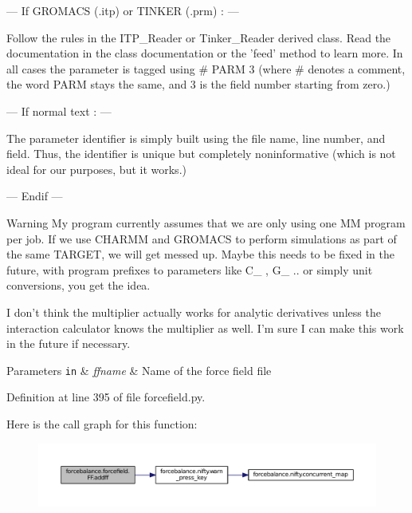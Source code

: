 --- If G\-R\-O\-M\-A\-C\-S (.itp) or T\-I\-N\-K\-E\-R (.prm) \-: ---

Follow the rules in the I\-T\-P\-\_\-\-Reader or Tinker\-\_\-\-Reader derived class. Read the documentation in the class documentation or the 'feed' method to learn more. In all cases the parameter is tagged using {\ttfamily  \# P\-A\-R\-M 3 } (where \# denotes a comment, the word P\-A\-R\-M stays the same, and 3 is the field number starting from zero.)

--- If normal text \-: ---

The parameter identifier is simply built using the file name, line number, and field. Thus, the identifier is unique but completely noninformative (which is not ideal for our purposes, but it works.)

--- Endif ---

\begin{DoxyWarning}{Warning}
My program currently assumes that we are only using one M\-M program per job. If we use C\-H\-A\-R\-M\-M and G\-R\-O\-M\-A\-C\-S to perform simulations as part of the same T\-A\-R\-G\-E\-T, we will get messed up. Maybe this needs to be fixed in the future, with program prefixes to parameters like C\-\_\- , G\-\_\- .. or simply unit conversions, you get the idea.

I don't think the multiplier actually works for analytic derivatives unless the interaction calculator knows the multiplier as well. I'm sure I can make this work in the future if necessary.
\end{DoxyWarning}

\begin{DoxyParams}[1]{Parameters}
\mbox{\tt in}  & {\em ffname} & Name of the force field file \\
\hline
\end{DoxyParams}


Definition at line 395 of file forcefield.\-py.



Here is the call graph for this function\-:
\nopagebreak
\begin{figure}[H]
\begin{center}
\leavevmode
\includegraphics[width=350pt]{classforcebalance_1_1forcefield_1_1FF_a142d41c86b9b0ef57f93ec6fb349357b_cgraph}
\end{center}
\end{figure}


